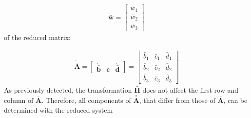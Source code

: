 \begin{align}
\mathbf{\dot{\bar{w}}}
= 
\begin{bmatrix}
\bar{w}_1\\
\bar{w}_2\\
\bar{w}_3
\end{bmatrix}
\end{align}
%
of the reduced matrix:

\begin{align}
\mathbf{\dot{\bar{A}}}
=
\begin{bmatrix}
\mathbf{\dot{\bar{b}}} & \mathbf{\dot{\bar{c}}} & \mathbf{\dot{\bar{d}}}
\end{bmatrix}
=
\begin{bmatrix}
\bar{b}_1&\bar{c}_1&\bar{d}_1\\
\bar{b}_2&\bar{c}_2&\bar{d}_2\\
\bar{b}_3&\bar{c}_3&\bar{d}_3
\end{bmatrix}					  
\end{align}
%
As previously detected, the transformation $\mathbf{\bar{H}}$ does not affect the first row and column of $\mathbf{\bar{A}}$.
Therefore, all components of $\mathbf{\bar{\bar{A}}}$, that differ from those of $\mathbf{\bar{A}}$, can be determined with the reduced system

